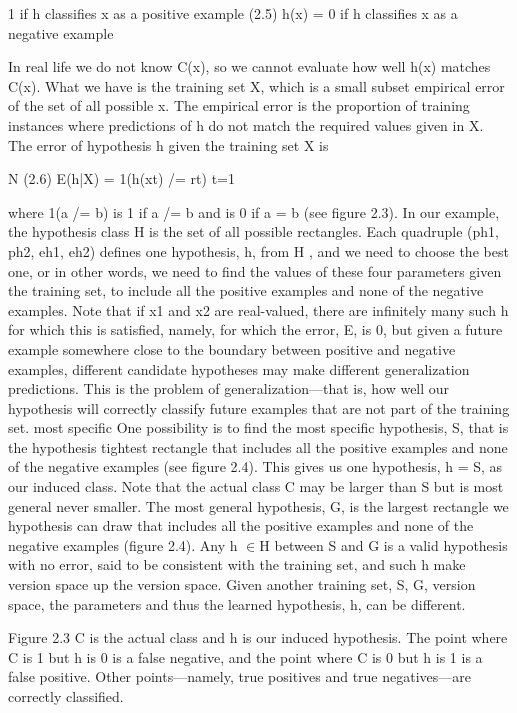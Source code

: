 1 if h classifies x as a positive example (2.5) h(x) = 0 if h classifies x as a negative example

In real life we do not know C(x), so we cannot evaluate how well h(x) matches C(x). What we have is the training set X, which is a small subset empirical error of the set of all possible x. The empirical error is the proportion of training instances where predictions of h do not match the required values given in X. The error of hypothesis h given the training set X is

N (2.6) E(h|X) = 1(h(xt) /= rt) t=1

where 1(a /= b) is 1 if a /= b and is 0 if a = b (see figure 2.3). In our example, the hypothesis class H is the set of all possible rectangles. Each quadruple (ph1, ph2, eh1, eh2) defines one hypothesis, h, from H , and we need to choose the best one, or in other words, we need to find the values of these four parameters given the training set, to include all the positive examples and none of the negative examples. Note that if x1 and x2 are real-valued, there are infinitely many such h for which this is satisfied, namely, for which the error, E, is 0, but given a future example somewhere close to the boundary between positive and negative examples, different candidate hypotheses may make different generalization predictions. This is the problem of generalization---that is, how well our hypothesis will correctly classify future examples that are not part of the training set. most specific One possibility is to find the most specific hypothesis, S, that is the hypothesis tightest rectangle that includes all the positive examples and none of the negative examples (see figure 2.4). This gives us one hypothesis, h = S, as our induced class. Note that the actual class C may be larger than S but is most general never smaller. The most general hypothesis, G, is the largest rectangle we hypothesis can draw that includes all the positive examples and none of the negative examples (figure 2.4). Any h $\in$H between S and G is a valid hypothesis with no error, said to be consistent with the training set, and such h make version space up the version space. Given another training set, S, G, version space, the parameters and thus the learned hypothesis, h, can be different.

Figure 2.3 C is the actual class and h is our induced hypothesis. The point where C is 1 but h is 0 is a false negative, and the point where C is 0 but h is 1 is a false positive. Other points---namely, true positives and true negatives---are correctly classified.

